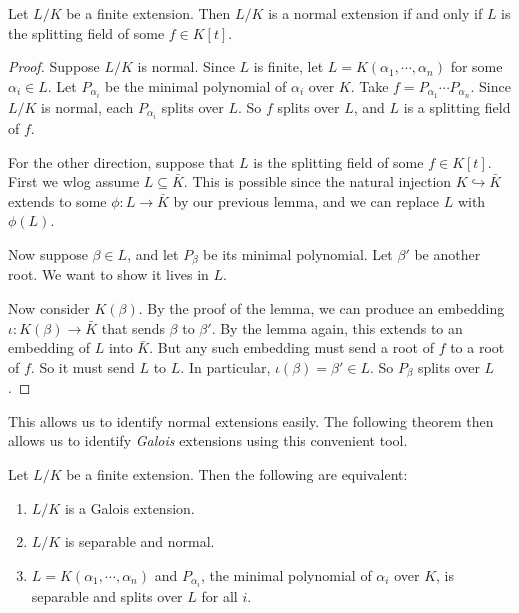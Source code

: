 \documentclass[a4paper]{article}
\begin{document}
\begin{thm}
  Let $L/K$ be a finite extension. Then $L/K$ is a normal extension if and only if $L$ is the splitting field of some $f \in K[t]$.
\end{thm}

\begin{proof}
  Suppose $L/K$ is normal. Since $L$ is finite, let $L = K(\alpha_1, \cdots, \alpha_n)$ for some $\alpha_i \in L$. Let $P_{\alpha_i}$ be the minimal polynomial of $\alpha_i$ over $K$. Take $f = P_{\alpha_1}\cdots P_{\alpha_n}$. Since $L/K$ is normal, each $P_{\alpha_i}$ splits over $L$. So $f$ splits over $L$, and $L$ is a splitting field of $f$.

  For the other direction, suppose that $L$ is the splitting field of some $f \in K[t]$. First we wlog assume $L \subseteq \bar K$. This is possible since the natural injection $K\hookrightarrow \bar{K}$ extends to some $\phi:L \to \bar{K}$ by our previous lemma, and we can replace $L$ with $\phi(L)$.

  Now suppose $\beta \in L$, and let $P_\beta$ be its minimal polynomial. Let $\beta'$ be another root. We want to show it lives in $L$.

  Now consider $K(\beta)$. By the proof of the lemma, we can produce an embedding $\iota: K(\beta) \to \bar{K}$ that sends $\beta$ to $\beta'$. By the lemma again, this extends to an embedding of $L$ into $\bar{K}$. But any such embedding must send a root of $f$ to a root of $f$. So it must send $L$ to $L$. In particular, $\iota(\beta) = \beta'\in L$. So $P_\beta$ splits over $L$.
\end{proof}

This allows us to identify normal extensions easily. The following theorem then allows us to identify \emph{Galois} extensions using this convenient tool.

\begin{thm}
  Let $L/K$ be a finite extension. Then the following are equivalent:
  \begin{enumerate}
    \item $L/K$ is a Galois extension.
    \item $L/K$ is separable and normal.
    \item $L = K(\alpha_1, \cdots, \alpha_n)$ and $P_{\alpha_i}$, the minimal polynomial of $\alpha_i$ over $K$, is separable and splits over $L$ for all $i$.
  \end{enumerate}
\end{thm}
\end{document}
